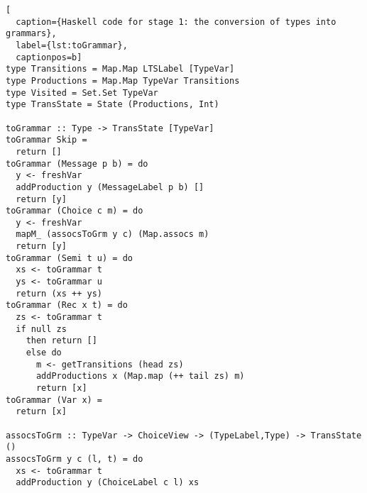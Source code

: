 \begin{lstlisting}[
  caption={Haskell code for stage 1: the conversion of types into grammars},
  label={lst:toGrammar},
  captionpos=b]
type Transitions = Map.Map LTSLabel [TypeVar]
type Productions = Map.Map TypeVar Transitions
type Visited = Set.Set TypeVar
type TransState = State (Productions, Int)

toGrammar :: Type -> TransState [TypeVar]
toGrammar Skip =
  return []
toGrammar (Message p b) = do
  y <- freshVar
  addProduction y (MessageLabel p b) []
  return [y]
toGrammar (Choice c m) = do
  y <- freshVar
  mapM_ (assocsToGrm y c) (Map.assocs m)
  return [y]
toGrammar (Semi t u) = do
  xs <- toGrammar t
  ys <- toGrammar u
  return (xs ++ ys)
toGrammar (Rec x t) = do
  zs <- toGrammar t
  if null zs
    then return []
    else do
      m <- getTransitions (head zs)
      addProductions x (Map.map (++ tail zs) m)
      return [x]
toGrammar (Var x) =
  return [x]

assocsToGrm :: TypeVar -> ChoiceView -> (TypeLabel,Type) -> TransState ()
assocsToGrm y c (l, t) = do
  xs <- toGrammar t
  addProduction y (ChoiceLabel c l) xs
\end{lstlisting}

